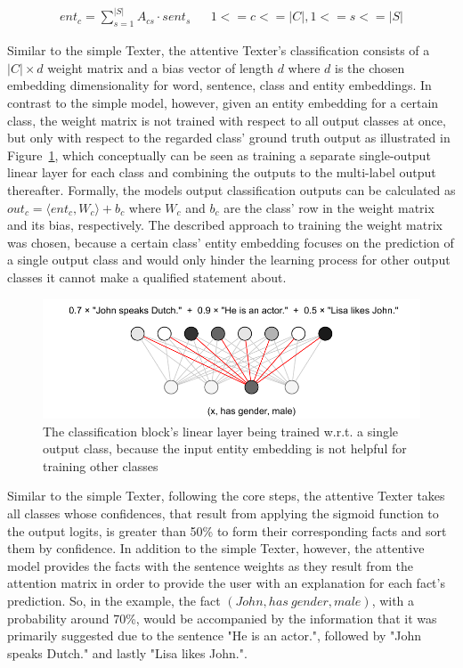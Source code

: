 \begin{align}
    ent_c = \sum_{s = 1}^{|S|} A_{cs} \cdot sent_s && 1 <= c <= |C|, 1 <= s <= |S|
    \label{eq:4_approach/1_texter/2_attention_model/ent_emb}
\end{align}

Similar to the simple Texter, the attentive Texter's classification consists of a $|C| \times d$ weight matrix and a bias vector of length $d$ where $d$ is the chosen embedding dimensionality for word, sentence, class and entity embeddings. In contrast to the simple model, however, given an entity embedding for a certain class, the weight matrix is not trained with respect to all output classes at once, but only with respect to the regarded class' ground truth output as illustrated in Figure~\ref{fig:4_approach/1_texter/2_attention_model/multi_linear}, which conceptually can be seen as training a separate single-output linear layer for each class and combining the outputs to the multi-label output thereafter. Formally, the models output classification outputs can be calculated as $out_c = \langle ent_c, W_c \rangle + b_c$ where $W_c$ and $b_c$ are the class' row in the weight matrix and its bias, respectively. The described approach to training the weight matrix was chosen, because a certain class' entity embedding focuses on the prediction of a single output class and would only hinder the learning process for other output classes it cannot make a qualified statement about.

\begin{figure}[t]
    \centering
    \includegraphics{4_approach/1_texter/2_attention_model/multi_linear}
    \caption{The classification block's linear layer being trained w.r.t. a single output class, because the input entity embedding is not helpful for training other classes}
    \label{fig:4_approach/1_texter/2_attention_model/multi_linear}
\end{figure}

Similar to the simple Texter, following the core steps, the attentive Texter takes all classes whose confidences, that result from applying the sigmoid function to the output logits, is greater than 50\% to form their corresponding facts and sort them by confidence. In addition to the simple Texter, however, the attentive model provides the facts with the sentence weights as they result from the attention matrix in order to provide the user with an explanation for each fact's prediction. So, in the example, the fact $(John, has~gender, male)$, with a probability around 70\%, would be accompanied by the information that it was primarily suggested due to the sentence "He is an actor.", followed by "John speaks Dutch." and lastly "Lisa likes John.".

